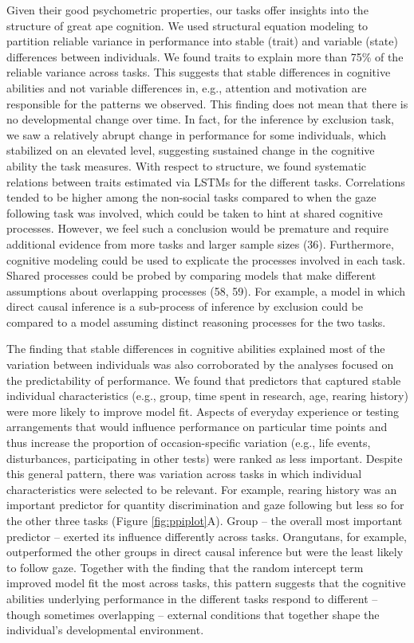 \documentclass[
  man,floatsintext]{apa6}
\begin{document}
Given their good psychometric properties, our tasks offer insights into the structure of great ape cognition. We used structural equation modeling to partition reliable variance in performance into stable (trait) and variable (state) differences between individuals. We found traits to explain more than 75\% of the reliable variance across tasks. This suggests that stable differences in cognitive abilities and not variable differences in, e.g., attention and motivation are responsible for the patterns we observed. This finding does not mean that there is no developmental change over time. In fact, for the inference by exclusion task, we saw a relatively abrupt change in performance for some individuals, which stabilized on an elevated level, suggesting sustained change in the cognitive ability the task measures. With respect to structure, we found systematic relations between traits estimated via LSTMs for the different tasks. Correlations tended to be higher among the non-social tasks compared to when the gaze following task was involved, which could be taken to hint at shared cognitive processes. However, we feel such a conclusion would be premature and require additional evidence from more tasks and larger sample sizes (36). Furthermore, cognitive modeling could be used to explicate the processes involved in each task. Shared processes could be probed by comparing models that make different assumptions about overlapping processes (58, 59). For example, a model in which direct causal inference is a sub-process of inference by exclusion could be compared to a model assuming distinct reasoning processes for the two tasks.

The finding that stable differences in cognitive abilities explained most of the variation between individuals was also corroborated by the analyses focused on the predictability of performance. We found that predictors that captured stable individual characteristics (e.g., group, time spent in research, age, rearing history) were more likely to improve model fit. Aspects of everyday experience or testing arrangements that would influence performance on particular time points and thus increase the proportion of occasion-specific variation (e.g., life events, disturbances, participating in other tests) were ranked as less important. Despite this general pattern, there was variation across tasks in which individual characteristics were selected to be relevant. For example, rearing history was an important predictor for quantity discrimination and gaze following but less so for the other three tasks (Figure \ref{fig:ppiplot}A). Group -- the overall most important predictor -- exerted its influence differently across tasks. Orangutans, for example, outperformed the other groups in direct causal inference but were the least likely to follow gaze. Together with the finding that the random intercept term improved model fit the most across tasks, this pattern suggests that the cognitive abilities underlying performance in the different tasks respond to different -- though sometimes overlapping -- external conditions that together shape the individual's developmental environment.
\end{document}
